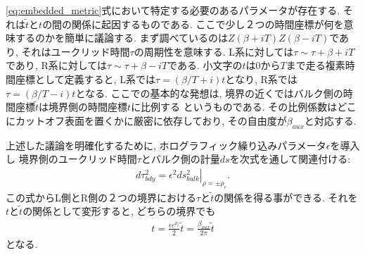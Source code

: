 \eqref{eq:embedded_metric}式において特定する必要のあるパラメータが存在する. 
それは$\tilde{t}$と$t$の間の関係に起因するものである. 
ここで少し２つの時間座標が何を意味するのかを簡単に議論する. 
まず調べているのは$Z(\beta + iT)Z(\beta - iT)$であり, それはユークリッド時間$\tau$の周期性を意味する. 
L系に対しては$\tau \sim \tau + \beta + iT$であり, 
R系に対しては$\tau \sim \tau + \beta - iT$である. 
小文字の$t$は0から$T$まで走る複素時間座標として定義すると, 
L系では$\tau = (\beta / T + i)t$となり, 
R系では$\tau = (\beta / T - i)t$となる. 
ここでの基本的な発想は, 境界の近くではバルク側の時間座標$\tilde{t}$は境界側の時間座標$t$に比例する
というものである. 
その比例係数はどこにカットオフ表面を置くかに厳密に依存しており, その自由度が$\beta_{aux}$と対応する. 

上述した議論を明確化するために, ホログラフィック繰り込みパラメータ$\epsilon$を導入し
境界側のユークリッド時間$\tau$とバルク側の計量$ds$を次式を通して関連付ける:
\begin{align}
	d\tau^2_{bdy} = \left.\epsilon^2ds^2_{bulk}\right|_{\rho = \pm\rho_c}.
\end{align}
この式からL側とR側の２つの境界における$\tau$と$\tilde{t}$の関係を得る事ができる. 
それを$t$と$\tilde{t}$の関係として変形すると, どちらの境界でも
\begin{align}
	t = \frac{\epsilon e^{\rho_c}}{2}\tilde{t} = \frac{\beta_{aux}}{2\pi}\tilde{t}
\end{align}
となる. 


\pagebreak